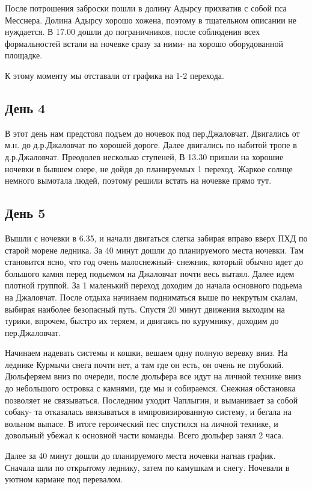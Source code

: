 \documentclass[]{article}
\begin{document}
После потрошения заброски пошли в долину Адырсу прихватив с собой пса Месснера. 
Долина Адырсу хорошо хожена, поэтому в тщательном описании не нуждается. 
В 17.00 дошли до пограничников, после соблюдения всех формальностей встали на ночевке сразу за ними- на хорошо оборудованной площадке.

К этому моменту мы отставали от графика на 1-2 перехода.
	
	
\subsection{День 4}	
В этот день нам предстоял подъем до ночевок под пер.Джаловчат. Двигались от м.н. до д.р.Джаловчат по хорошей дороге. Далее двигались по набитой тропе в д.р.Джаловчат. Преодолев несколько ступеней,  В 13.30 пришли на хорошие ночевки в бывшем озере, не дойдя до планируемых 1 переход. Жаркое солнце немного вымотала людей, поэтому решили встать на ночевке прямо тут.
	
	
\subsection{День 5}
Вышли с ночевки в 6.35, и начали двигаться слегка забирая вправо вверх ПХД по старой морене ледника. За 40 минут дошли до планируемого места ночевки. Там становится ясно, что год очень малоснежный- снежник, который обычно идет до большого камня перед подьемом на Джаловчат почти весь вытаял. Далее идем плотной группой. За 1 маленький переход доходим до начала основного подьема на Джаловчат. После отдыха начинаем подниматься выше по некрутым скалам, выбирая наиболее безопасный путь. Спустя 20 минут движения выходим на турики, впрочем, быстро их теряем, и двигаясь по курумнику, доходим до пер.Джаловчат.


Начинаем надевать системы и кошки, вешаем одну полную веревку вниз. На леднике Курмычи снега почти нет, а там где он есть, он очень не глубокий. Дюльферяем вниз по очереди, после дюльфера все идут на личной технике вниз до небольшого островка с камнями, где мы и собираемся. Снежная обстановка позволяет не связываться. 
Последним уходит Чаплыгин, и выманивает за собой собаку- та отказалась ввязываться в импровизированную систему, и бегала на вольном выпасе.
В итоге героический пес спустился на личной технике, и довольный убежал к основной части команды.
Всего дюльфер занял 2 часа. 

Далее за 40 минут дошли до планируемого места ночевки нагнав график. Сначала шли по открытому леднику, затем по камушкам и снегу. Ночевали в уютном кармане под перевалом. 
\end{document}
